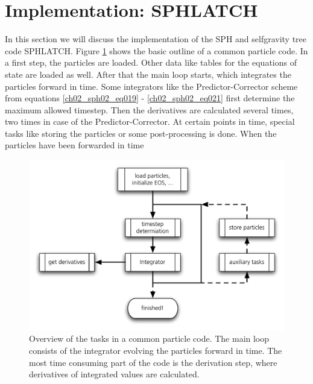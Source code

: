 \section{Implementation: SPHLATCH}
In this section we will discuss the implementation of the SPH and selfgravity tree code SPHLATCH. Figure \ref{ch02_grav02_fig11} shows the basic outline of a common particle code. In a first step, the particles are loaded. Other data like tables for the equations of state are loaded as well. After that the main loop starts, which integrates the particles forward in time. Some integrators like the Predictor-Corrector scheme from equations \ref{ch02_sph02_eq019} - \ref{ch02_sph02_eq021} first determine the maximum allowed timestep. Then the derivatives are calculated several times, two times in case of the Predictor-Corrector. At certain points in time, special tasks like storing the particles or some post-processing is done. When the particles have been forwarded in time 


\begin{figure}[htbp]
\begin{center}
\includegraphics[scale=0.6]{20algo_overview.pdf}
\caption{Overview of the tasks in a common particle code. The main loop consists of the integrator evolving the particles forward in time. The most time consuming part of the code is the derivation step, where derivatives of integrated values are calculated.}
\label{ch02_grav02_fig11}
\end{center}
\end{figure}

